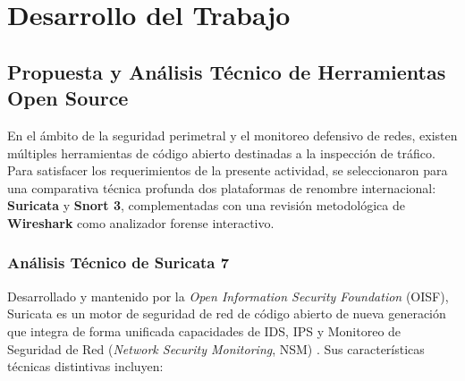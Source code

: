 
\section{Desarrollo del Trabajo}

\subsection{Propuesta y Análisis Técnico de Herramientas Open Source}

En el ámbito de la seguridad perimetral y el monitoreo defensivo de redes, existen múltiples herramientas de código abierto destinadas a la inspección de tráfico. Para satisfacer los requerimientos de la presente actividad, se seleccionaron para una comparativa técnica profunda dos plataformas de renombre internacional: \textbf{Suricata} y \textbf{Snort 3}, complementadas con una revisión metodológica de \textbf{Wireshark} como analizador forense interactivo.

\subsubsection{Análisis Técnico de Suricata 7}

Desarrollado y mantenido por la \textit{Open Information Security Foundation} (OISF), Suricata es un motor de seguridad de red de código abierto de nueva generación que integra de forma unificada capacidades de IDS, IPS y Monitoreo de Seguridad de Red (\textit{Network Security Monitoring}, NSM) \citep{oisf_suricata_2024}. Sus características técnicas distintivas incluyen:

